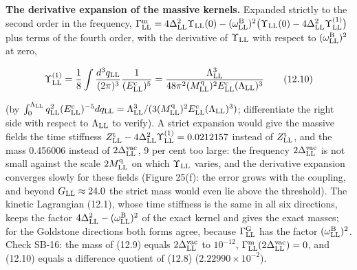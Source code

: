 \documentclass[
  10pt,
]{article}
\begin{document}
\textbf{The derivative expansion of the massive kernels.} Expanded
strictly to the second order in the frequency,
\(\Gamma^{\rm m}_{\rm LL}=4\Delta_{\rm LL}^2\Upsilon_{\rm LL}(0)-(\omega^{\rm B}_{\rm LL})^2\big(\Upsilon_{\rm LL}(0)-4\Delta_{\rm LL}^2\Upsilon^{(1)}_{\rm LL}\big)\)
plus terms of the fourth order, with the derivative of
\(\Upsilon_{\rm LL}\) with respect to \((\omega^{\rm B}_{\rm LL})^2\) at
zero,

\[\Upsilon^{(1)}_{\rm LL}=\frac18\int\frac{d^3q_{\rm LL}}{(2\pi)^3}\frac1{(E^{\rm c}_{\rm LL})^5}=\frac{\Lambda_{\rm LL}^3}{48\pi^2(M^{\rm q}_{\rm LL})^2E^{\rm c}_{\rm LL}(\Lambda_{\rm LL})^3}\tag{12.10}\]

(by
\(\int_0^{\Lambda_{\rm LL}}q_{\rm LL}^2(E^{\rm c}_{\rm LL})^{-5}dq_{\rm LL}=\Lambda_{\rm LL}^3/(3(M^{\rm q}_{\rm LL})^2E^{\rm c}_{\rm LL}(\Lambda_{\rm LL})^3)\);
differentiate the right side with respect to \(\Lambda_{\rm LL}\) to
verify). A strict expansion would give the massive fields the time
stiffness
\(Z^{\rm t}_{\rm LL}-4\Delta_{\rm LL}^2\Upsilon^{(1)}_{\rm LL}=0.0212157\)
instead of \(Z^{\rm t}_{\rm LL}\), and the mass 0.456006 instead of
\(2\Delta^{\rm vac}_{\rm LL}\), 9 per cent too large: the frequency
\(2\Delta^{\rm vac}_{\rm LL}\) is not small against the scale
\(2M^{\rm q}_{\rm LL}\) on which \(\Upsilon_{\rm LL}\) varies, and the
derivative expansion converges slowly for these fields (Figure 25(f):
the error grows with the coupling, and beyond \(G_{\rm LL}\approx24.0\)
the strict mass would even lie above the threshold). The kinetic
Lagrangian (12.1), whose time stiffness is the same in all six
directions, keeps the factor
\(4\Delta_{\rm LL}^2-(\omega^{\rm B}_{\rm LL})^2\) of the exact kernel
and gives the exact masses; for the Goldstone directions both forms
agree, because \(\Gamma^{\rm G}_{\rm LL}\) has the factor
\((\omega^{\rm B}_{\rm LL})^2\). Check SB-16: the mass of (12.9) equals
\(2\Delta^{\rm vac}_{\rm LL}\) to \(10^{-12}\),
\(\Gamma^{\rm m}_{\rm LL}(2\Delta^{\rm vac}_{\rm LL})=0\), and (12.10)
equals a difference quotient of (12.8) (\(2.22990\times10^{-2}\)).
\end{document}
